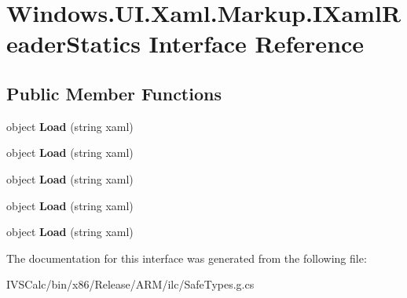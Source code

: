 \hypertarget{interface_windows_1_1_u_i_1_1_xaml_1_1_markup_1_1_i_xaml_reader_statics}{}\section{Windows.\+U\+I.\+Xaml.\+Markup.\+I\+Xaml\+Reader\+Statics Interface Reference}
\label{interface_windows_1_1_u_i_1_1_xaml_1_1_markup_1_1_i_xaml_reader_statics}
\subsection*{Public Member Functions}
\begin{DoxyCompactItemize}
\item 
\mbox{\label{interface_windows_1_1_u_i_1_1_xaml_1_1_markup_1_1_i_xaml_reader_statics_aa1ddf979a764b16cd60b2abab07c0363}} 
object {\bfseries Load} (string xaml)
\item 
\mbox{\label{interface_windows_1_1_u_i_1_1_xaml_1_1_markup_1_1_i_xaml_reader_statics_aa1ddf979a764b16cd60b2abab07c0363}} 
object {\bfseries Load} (string xaml)
\item 
\mbox{\label{interface_windows_1_1_u_i_1_1_xaml_1_1_markup_1_1_i_xaml_reader_statics_aa1ddf979a764b16cd60b2abab07c0363}} 
object {\bfseries Load} (string xaml)
\item 
\mbox{\label{interface_windows_1_1_u_i_1_1_xaml_1_1_markup_1_1_i_xaml_reader_statics_aa1ddf979a764b16cd60b2abab07c0363}} 
object {\bfseries Load} (string xaml)
\item 
\mbox{\label{interface_windows_1_1_u_i_1_1_xaml_1_1_markup_1_1_i_xaml_reader_statics_aa1ddf979a764b16cd60b2abab07c0363}} 
object {\bfseries Load} (string xaml)
\end{DoxyCompactItemize}


The documentation for this interface was generated from the following file\+:\begin{DoxyCompactItemize}
\item 
I\+V\+S\+Calc/bin/x86/\+Release/\+A\+R\+M/ilc/Safe\+Types.\+g.\+cs\end{DoxyCompactItemize}

